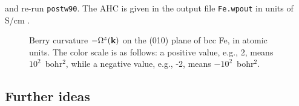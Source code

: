\documentclass[a4paper,11pt,twoside]{article}
\begin{document}
and re-run {\tt postw90}.  The AHC is given in the output file {\tt Fe.wpout} in
units of S/cm .

\begin{figure}[h]
\begin{center}
\caption{Berry curvature $-\Omega^z({\bf k})$ on the (010) plane of
  bcc Fe, in atomic units.  The color scale is as follows:
  a positive value, e.g., 2, means $10^2$~bohr$^2$, while a negative value,
  e.g., -2, means $-10^2$~bohr$^2$.}
\label{fig:fe-curv-slice}
\end{center}
\end{figure}

\subsection*{Further ideas}
\end{document}
